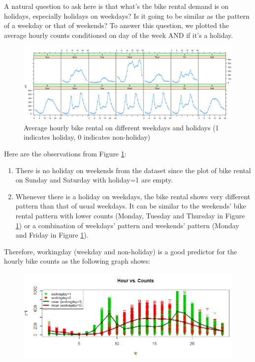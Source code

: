 \documentclass[12pt]{article}
\begin{document}
	A natural question to ask here is that what's the bike rental demand is on holidays, especially holidays on weekdays?  Is it going to be similar as the pattern of a weekday or that of weekends? To answer this question, we plotted the average hourly counts conditioned on day of the week AND if it's a holiday.
		\begin{figure}[H]
			\centering
			\includegraphics[scale=.5]{figures/hr_weekday_holiday.png}
			\caption{Average hourly bike rental on different weekdays and holidays (1 indicates holiday, 0 indicates non-holiday)} 
			\label{fig:weekday_holiday}
		\end{figure}
		
	Here are the observations from Figure \ref{fig:weekday_holiday}:
	\begin{enumerate}
		\item There is no holiday on weekends from the dataset since the plot of bike rental on Sunday and Saturday with holiday=1 are empty.
		\item Whenever there is a holiday on weekdays, the bike rental shows very different pattern than that of usual weekdays. It can be similar to the weekends' bike rental pattern with lower counts (Monday, Tuesday and Thursday in Figure \ref{fig:weekday_holiday}) or a combination of weekdays' pattern and weekends' pattern (Monday and Friday in Figure \ref{fig:weekday_holiday}). 
	\end{enumerate}
	
 Therefore, workingday (weekday and non-holiday) is a good predictor for the hourly bike counts as the following graph shows: 
	\begin{figure}[H]
		\centering
		\includegraphics[width=\linewidth]{figures/hr_cnt.png}
	\end{figure}
	
\end{document}

